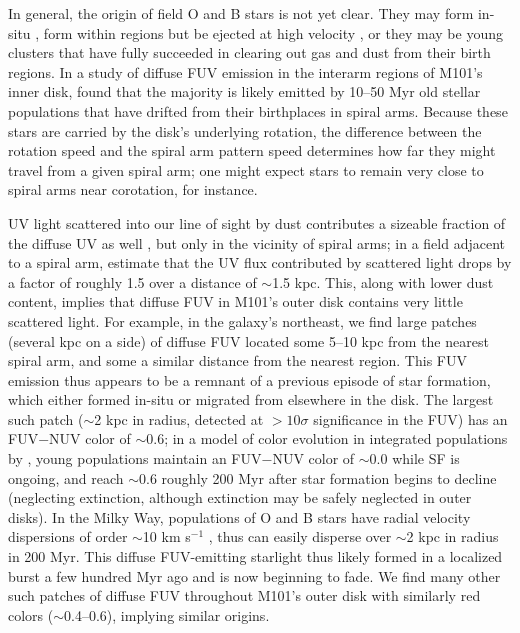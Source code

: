 \documentclass[iop]{emulateapj}
\begin{document}
In general, the origin of field O and B stars is not yet clear.  They
may form in-situ \citep{dewit05, lamb10, oey13}, form within
 regions but be ejected at high velocity \citep{gies87,
  moffat98, dewit05}, or they may be young clusters that have fully
succeeded in clearing out gas and dust from their birth 
regions.  In a study of diffuse FUV emission in the interarm regions
of M101's inner disk, \citet{crocker15} found that the majority
is likely emitted by 10--50 Myr old stellar populations that have
drifted from their birthplaces in spiral arms.  Because these stars
are carried by the disk's underlying rotation, the difference
between the rotation speed and the spiral arm pattern speed determines
how far they might travel from a given spiral arm; one might expect
stars to remain very close to spiral arms near corotation, for
instance.

UV light scattered into our line of sight by dust contributes a
sizeable fraction of the diffuse UV as well \citep[upward of
  $\sim$60\%;][]{crocker15}, but only in the vicinity of spiral arms;
in a field adjacent to a spiral arm, \citet{crocker15} estimate that
the UV flux contributed by scattered light drops by a factor of
roughly 1.5 over a distance of $\sim$1.5 kpc.  This, along with lower
dust content, implies that diffuse FUV in M101's outer disk contains
very little scattered light.  For example, in the galaxy's northeast,
we find large patches (several kpc on a side) of diffuse FUV located
some 5--10 kpc from the nearest spiral arm, and some a similar
distance from the nearest  region.  This FUV emission thus
appears to be a remnant of a previous episode of star formation, which
either formed in-situ or migrated from elsewhere in the disk.  The
largest such patch ($\sim$2 kpc in radius, detected at $> 10\sigma$
significance in the FUV) has an FUV$-$NUV color of $\sim$0.6; in a
model of color evolution in integrated populations by
\citet{boissier08}, young populations maintain an FUV$-$NUV color of
$\sim$0.0 while SF is ongoing, and reach $\sim$0.6 roughly 200 Myr
after star formation begins to decline (neglecting extinction,
although extinction may be safely neglected in outer disks).  In the
Milky Way, populations of O and B stars have radial velocity
dispersions of order $\sim$10 km s$^{-1}$ \citep{binney98}, thus can
easily disperse over $\sim$2 kpc in radius in 200 Myr.  This diffuse
FUV-emitting starlight thus likely formed in a localized burst a few
hundred Myr ago and is now beginning to fade.  We find many other such
patches of diffuse FUV throughout M101's outer disk with similarly red
colors ($\sim$0.4--0.6), implying similar origins.
\end{document}
